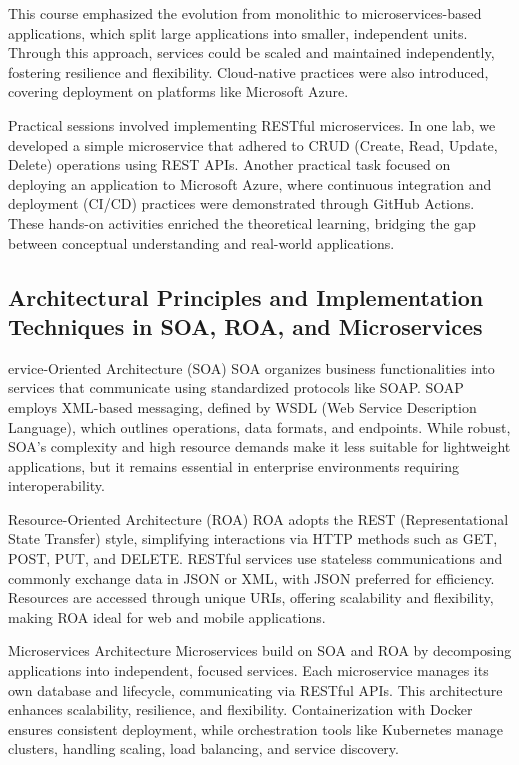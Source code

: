 This course emphasized the evolution from monolithic to microservices-based applications, which split large applications into smaller, independent units. Through this approach, services could be scaled and maintained independently, fostering resilience and flexibility. Cloud-native practices were also introduced, covering deployment on platforms like Microsoft Azure.

Practical sessions involved implementing RESTful microservices. In one lab, we developed a simple microservice that adhered to CRUD (Create, Read, Update, Delete) operations using REST APIs. Another practical task focused on deploying an application to Microsoft Azure, where continuous integration and deployment (CI/CD) practices were demonstrated through GitHub Actions. These hands-on activities enriched the theoretical learning, bridging the gap between conceptual understanding and real-world applications.

\subsection{Architectural Principles and Implementation Techniques in SOA, ROA, and Microservices}

ervice-Oriented Architecture (SOA)
SOA organizes business functionalities into services that communicate using standardized protocols like SOAP. SOAP employs XML-based messaging, defined by WSDL (Web Service Description Language), which outlines operations, data formats, and endpoints. While robust, SOA’s complexity and high resource demands make it less suitable for lightweight applications, but it remains essential in enterprise environments requiring interoperability.

Resource-Oriented Architecture (ROA)
ROA adopts the REST (Representational State Transfer) style, simplifying interactions via HTTP methods such as GET, POST, PUT, and DELETE. RESTful services use stateless communications and commonly exchange data in JSON or XML, with JSON preferred for efficiency. Resources are accessed through unique URIs, offering scalability and flexibility, making ROA ideal for web and mobile applications.

Microservices Architecture
Microservices build on SOA and ROA by decomposing applications into independent, focused services. Each microservice manages its own database and lifecycle, communicating via RESTful APIs. This architecture enhances scalability, resilience, and flexibility. Containerization with Docker ensures consistent deployment, while orchestration tools like Kubernetes manage clusters, handling scaling, load balancing, and service discovery.


